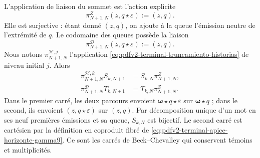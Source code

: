 L'application de liaison du sommet est l'action explicite
\begin{equation}
\label{eq:pdfv2-terminal-gamma9-enlace-apice}
 \pi^Z_{N+1,N}(z,q\star\varepsilon):=(z,q).
\end{equation}
Elle est surjective : étant donné \((z,q)\), on ajoute à la queue l'émission neutre de l'extrémité de \(q\). Le codomaine des queues possède la liaison
\begin{equation}
\label{eq:pdfv2-terminal-gamma9-enlace-codominio}
 \pi^{\mathscr D}_{N+1,N}(z,q\star\varepsilon):=(z,q).
\end{equation}
Nous notons \(\pi^{\mathscr H,j}_{N+1,N}\) l'application \eqref{eq:pdfv2-terminal-truncamiento-historias} de niveau initial \(j\). Alors
\begin{align}
 \pi^{\mathscr H,k}_{N+1,N}S_{k,N+1}
 &=S_{k,N}\pi^Z_{N+1,N},
 \label{eq:pdfv2-terminal-gamma9-cuadrado-fuente}\\
 \pi^{\mathscr D}_{N+1,N}T_{k,N+1}
 &=T_{k,N}\pi^Z_{N+1,N}.
 \label{eq:pdfv2-terminal-gamma9-cuadrado-destino}
\end{align}
Dans le premier carré, les deux parcours envoient \(\boldsymbol\omega\star q\star\varepsilon\) sur \(\boldsymbol\omega\star q\) ; dans le second, ils envoient \((z,q\star\varepsilon)\) sur \((z,q)\). Par décomposition unique d'un mot en ses neuf premières émissions et sa queue, \(S_{k,N}\) est bijectif. Le second carré est cartésien par la définition en coproduit fibré de \eqref{eq:pdfv2-terminal-apice-horizonte-gamma9}. Ce sont les carrés de Beck--Chevalley qui conservent témoins et multiplicités.

